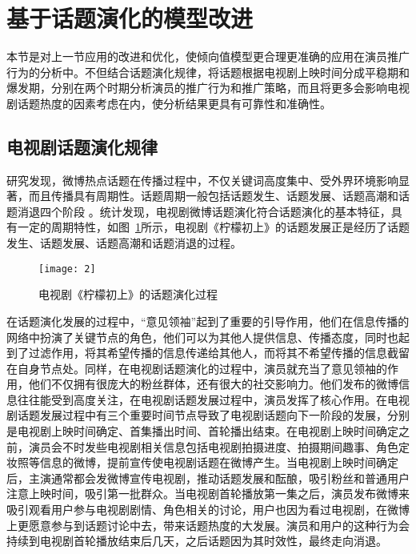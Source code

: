 \section{基于话题演化的模型改进}

本节是对上一节应用的改进和优化，使倾向值模型更合理更准确的应用在演员推广行为的分析中。不但结合话题演化规律，将话题根据电视剧上映时间分成平稳期和爆发期，分别在两个时期分析演员的推广行为和推广策略，而且将更多会影响电视剧话题热度的因素考虑在内，使分析结果更具有可靠性和准确性。

\subsection{电视剧话题演化规律}

研究发现，微博热点话题在传播过程中，不仅关键词高度集中、受外界环境影响显著，而且传播具有周期性。话题周期一般包括话题发生、话题发展、话题高潮和话题消退四个阶段 \cite{赵龙文2013基于意见领袖参与行为的微博话题热度预测研究}。统计发现，电视剧微博话题演化符合话题演化的基本特征，具有一定的周期特性，如图~\ref{ning}所示，电视剧《柠檬初上》的话题发展正是经历了话题发生、话题发展、话题高潮和话题消退的过程。

\begin{figure}[!htbp]
\centering
\texttt{[image: 2]}
\caption{电视剧《柠檬初上》的话题演化过程}
\label{ning}
\end{figure}

在话题演化发展的过程中，“意见领袖”起到了重要的引导作用，他们在信息传播的网络中扮演了关键节点的角色，他们可以为其他人提供信息、传播态度，同时也起到了过滤作用，将其希望传播的信息传递给其他人，而将其不希望传播的信息截留在自身节点处。同样，在电视剧话题演化的过程中，演员就充当了意见领袖的作用，他们不仅拥有很庞大的粉丝群体，还有很大的社交影响力。他们发布的微博信息往往能受到高度关注，在电视剧话题发展过程中，演员发挥了核心作用。在电视剧话题发展过程中有三个重要时间节点导致了电视剧话题向下一阶段的发展，分别是电视剧上映时间确定、首集播出时间、首轮播出结束。在电视剧上映时间确定之前，演员会不时发些电视剧相关信息包括电视剧拍摄进度、拍摄期间趣事、角色定妆照等信息的微博，提前宣传使电视剧话题在微博产生。当电视剧上映时间确定后，主演通常都会发微博宣传电视剧，推动话题发展和酝酿，吸引粉丝和普通用户注意上映时间，吸引第一批群众。当电视剧首轮播放第一集之后，演员发布微博来吸引观看用户参与电视剧剧情、角色相关的讨论，用户也因为看过电视剧，在微博上更愿意参与到话题讨论中去，带来话题热度的大发展。演员和用户的这种行为会持续到电视剧首轮播放结束后几天，之后话题因为其时效性，最终走向消退。

